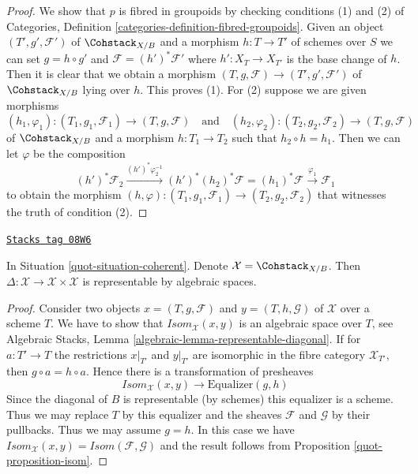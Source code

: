 \begin{proof}
We show that $p$ is fibred in groupoids by checking conditions
(1) and (2) of Categories, Definition
\ref{categories-definition-fibred-groupoids}.
Given an object $(T', g', \mathcal{F}')$
of $\Cohstack_{X/B}$ and a morphism $h : T \to T'$ of
schemes over $S$ we can set $g = h \circ g'$ and
$\mathcal{F} = (h')^*\mathcal{F}'$ where $h' : X_T \to X_{T'}$
is the base change of $h$. Then it is clear that we obtain
a morphism $(T, g, \mathcal{F}) \to (T', g', \mathcal{F}')$
of $\Cohstack_{X/B}$ lying over $h$. This proves (1).
For (2) suppose we are given morphisms
$$
(h_1, \varphi_1) : (T_1, g_1, \mathcal{F}_1) \to (T, g, \mathcal{F})
\quad\text{and}\quad
(h_2, \varphi_2) : (T_2, g_2, \mathcal{F}_2) \to (T, g, \mathcal{F})
$$
of $\Cohstack_{X/B}$ and a morphism $h : T_1 \to T_2$ such that
$h_2 \circ h = h_1$. Then we can let $\varphi$ be the composition
$$
(h')^*\mathcal{F}_2
\xrightarrow{(h')^*\varphi_2^{-1}}
(h')^*(h_2)^*\mathcal{F} = (h_1)^*\mathcal{F}
\xrightarrow{\varphi_1}
\mathcal{F}_1
$$
to obtain the morphism
$(h, \varphi) : (T_1, g_1, \mathcal{F}_1) \to (T_2, g_2, \mathcal{F}_2)$
that witnesses the truth of condition (2).
\end{proof}

\begin{lemma}
\label{quot-lemma-coherent-diagonal}
\href{https://stacks.math.columbia.edu/tag/08W6}{\texttt{Stacks tag 08W6}}

In Situation \ref{quot-situation-coherent}. Denote
$\mathcal{X} = \Cohstack_{X/B}$. Then
$\Delta : \mathcal{X} \to \mathcal{X} \times \mathcal{X}$ is
representable by algebraic spaces.
\end{lemma}

\begin{proof}

Consider two objects $x = (T, g, \mathcal{F})$ and $y = (T, h, \mathcal{G})$
of $\mathcal{X}$ over a scheme $T$. We have to show that
$\mathit{Isom}_\mathcal{X}(x, y)$ is an algebraic space over $T$, see
Algebraic Stacks, Lemma \ref{algebraic-lemma-representable-diagonal}.
If for $a : T' \to T$ the restrictions $x|_{T'}$ and $y|_{T'}$ are isomorphic
in the fibre category $\mathcal{X}_{T'}$, then $g \circ a = h \circ a$.
Hence there is a transformation of presheaves
$$
\mathit{Isom}_\mathcal{X}(x, y) \longrightarrow \text{Equalizer}(g, h)
$$
Since the diagonal of $B$ is representable (by schemes) this equalizer is
a scheme. Thus we may replace $T$ by this equalizer and the sheaves
$\mathcal{F}$ and $\mathcal{G}$ by their pullbacks. Thus we may assume
$g = h$. In this case we have
$\mathit{Isom}_\mathcal{X}(x, y) = \mathit{Isom}(\mathcal{F}, \mathcal{G})$
and the result follows from Proposition \ref{quot-proposition-isom}.
\end{proof}

